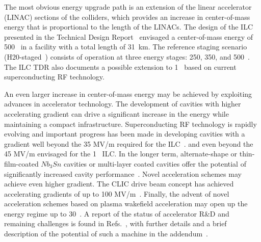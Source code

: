 The most obvious energy upgrade path is an extension of the linear
accelerator (LINAC) sections of the colliders, which provides an increase
in center-of-mass energy that is proportional to the length of the LINACs.
The design of the ILC presented in the Technical Design
Report~\cite{Behnke:2013xla,Adolphsen:2013jya,Adolphsen:2013kya} envisaged a
center-of-mass energy of 500~\GeV{} in a facility with a total length of 31~km.
The reference staging scenario (H20-staged~\cite{Barklow:2015tja}) consists of operation at
three energy stages: 250, 350, and 500~\GeV. The ILC TDR also documents
a possible extension to 1~\TeV{} based on current superconducting RF technology. 



An even larger increase in center-of-mass energy may be achieved by
exploiting advances in accelerator technology. The development of
cavities with higher accelerating gradient can drive a significant
increase in the energy while maintaining a compact infrastructure.
Superconducting RF technology is rapidly evolving and important
progress has been made in developing cavities with a gradient well
beyond the 35 MV/m required for the ILC~\cite{Grassellino:2018tqg,Grassellino:2017bod}.
and even beyond the 45 MV/m envisaged for the 1~\tev{} ILC. In the longer term, alternate-shape
or thin-film-coated $Nb_3Sn$ cavities or multi-layer coated cavities offer the potential of
significantly increased cavity performance~\cite{Adolphsen:2013jya}.
Novel acceleration schemes may achieve even higher gradient. The CLIC drive beam concept has
achieved accelerating gradients of up to 100 MV/m~\cite{Aicheler:2012bya}.
Finally, the advent of novel acceleration schemes based on plasma wakefield acceleration
may open up the energy regime up to 30~\tev. A report of the status of accelerator R\&D and remaining
challenges is found in Refs.~\cite{advancedLC2020,advancedLC}, with further details and
a brief description of the potential of such a machine in the
addendum~\cite{advancedLCaddendum}.


